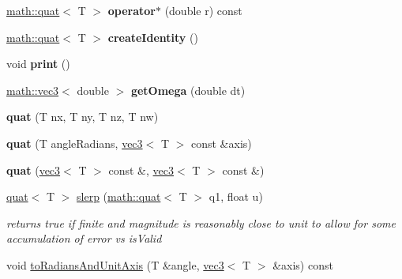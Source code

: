 \begin{DoxyCompactItemize}
\item 
\hypertarget{classmath_1_1quat_a6214d28d9c15963acbb9cc7513a682a5}{
\hyperlink{classmath_1_1quat}{math::quat}$<$ T $>$ {\bfseries operator$\ast$} (double r) const }
\label{classmath_1_1quat_a6214d28d9c15963acbb9cc7513a682a5}

\item 
\hypertarget{classmath_1_1quat_a64e81f63f89c4b43c981e218ce808fd5}{
\hyperlink{classmath_1_1quat}{math::quat}$<$ T $>$ {\bfseries createIdentity} ()}
\label{classmath_1_1quat_a64e81f63f89c4b43c981e218ce808fd5}

\item 
\hypertarget{classmath_1_1quat_a3bd342a3da3dd15fa2fc9b183a2c44e3}{
void {\bfseries print} ()}
\label{classmath_1_1quat_a3bd342a3da3dd15fa2fc9b183a2c44e3}

\item 
\hypertarget{classmath_1_1quat_ae314fa8c4ac586c9048e10e804c318f1}{
\hyperlink{classmath_1_1vec3}{math::vec3}$<$ double $>$ {\bfseries getOmega} (double dt)}
\label{classmath_1_1quat_ae314fa8c4ac586c9048e10e804c318f1}

\item 
\hypertarget{classmath_1_1quat_aec2acb1b693c9be5e6ba4918284aa0b5}{
{\bfseries quat} (T nx, T ny, T nz, T nw)}
\label{classmath_1_1quat_aec2acb1b693c9be5e6ba4918284aa0b5}

\item 
\hypertarget{classmath_1_1quat_a550f7a8cec2250fc8c40d7d3879cb07c}{
{\bfseries quat} (T angleRadians, \hyperlink{classmath_1_1vec3}{vec3}$<$ T $>$ const \&axis)}
\label{classmath_1_1quat_a550f7a8cec2250fc8c40d7d3879cb07c}

\item 
\hypertarget{classmath_1_1quat_a5a17ae805087d52d28ce24aeb5c0c2e0}{
{\bfseries quat} (\hyperlink{classmath_1_1vec3}{vec3}$<$ T $>$ const \&, \hyperlink{classmath_1_1vec3}{vec3}$<$ T $>$ const \&)}
\label{classmath_1_1quat_a5a17ae805087d52d28ce24aeb5c0c2e0}

\item 
\hypertarget{classmath_1_1quat_a81ac4c1bf899e340d2c53856902aab26}{
\hyperlink{classmath_1_1quat}{quat}$<$ T $>$ \hyperlink{classmath_1_1quat_a81ac4c1bf899e340d2c53856902aab26}{slerp} (\hyperlink{classmath_1_1quat}{math::quat}$<$ T $>$ q1, float u)}
\label{classmath_1_1quat_a81ac4c1bf899e340d2c53856902aab26}

\begin{DoxyCompactList}\small\item\em returns true if finite and magnitude is reasonably close to unit to allow for some accumulation of error vs isValid \item\end{DoxyCompactList}\item 
\hypertarget{classmath_1_1quat_a32e61ba1bbbdc8d836391297ea8d4d4a}{
void \hyperlink{classmath_1_1quat_a32e61ba1bbbdc8d836391297ea8d4d4a}{toRadiansAndUnitAxis} (T \&angle, \hyperlink{classmath_1_1vec3}{vec3}$<$ T $>$ \&axis) const }
\label{classmath_1_1quat_a32e61ba1bbbdc8d836391297ea8d4d4a}


\end{DoxyCompactItemize}
